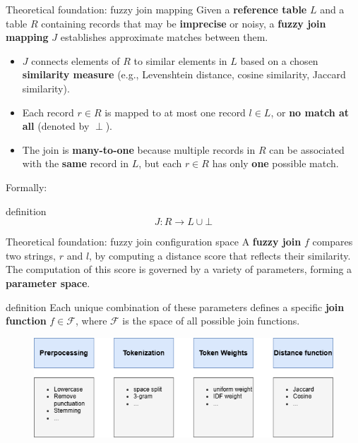 \documentclass[8pt]{beamer} %
\begin{document}

\begin{frame}{Theoretical foundation: fuzzy join mapping}
	Given a \textbf{reference table} $L$ and a table $R$ containing records that may be \textbf{imprecise} or noisy, a \textbf{fuzzy join mapping} $J$ establishes approximate matches between them.
	
	\begin{itemize}
	\item $J$ connects elements of $R$ to similar elements in $L$ based on a chosen \textbf{similarity measure} (e.g., Levenshtein distance, cosine similarity, Jaccard similarity).
	\item Each record $r \in R$ is mapped to at most one record $l \in L$, or \textbf{no match at all} (denoted by $\perp$).
	\item The join is \textbf{many-to-one} because multiple records in $R$ can be associated with the \textbf{same} record in $L$, but each $r \in R$ has only \textbf{one} possible match.
	\end{itemize}
	
	Formally:
	\begin{beamercolorbox}[rounded=true, shadow=true, leftskip=1em, rightskip=1em]{definition}
		$$
		J: R \rightarrow L \cup \bot
		$$
	\end{beamercolorbox}
\end{frame}


\begin{frame}{Theoretical foundation: fuzzy join configuration space}
	A \textbf{fuzzy join} $f$ compares two strings, $r$ and $l$, by computing a distance score that reflects their similarity. The computation of this score is governed by a variety of parameters, forming a \textbf{parameter space}. 
	
	\vspace{1em}

	\begin{beamercolorbox}[rounded=true, shadow=true, leftskip=1em, rightskip=1em]{definition}
		Each unique combination of these parameters defines a specific \textbf{join function} $f \in \mathcal{F}$, where $\mathcal{F}$ is the space of all possible join functions.
	\end{beamercolorbox}

	\vspace{1em}
		
	\begin{figure}
		\centering
				\includegraphics[width=0.7\linewidth]{img/img-join-configuration.png}
	\end{figure}
\end{frame}
\end{document}
